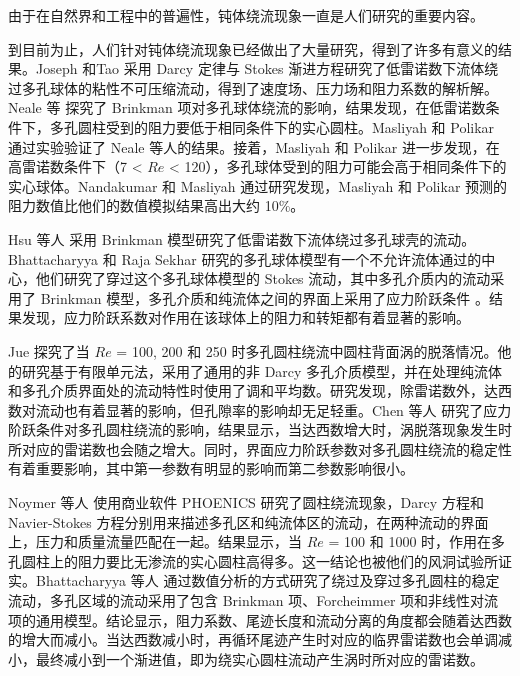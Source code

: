 由于在自然界和工程中的普遍性，钝体绕流现象一直是人们研究的重要内容。

到目前为止，人们针对钝体绕流现象已经做出了大量研究，得到了许多有意义的结果。Joseph 和Tao \cite{joseph1964effect} 采用 Darcy 定律与 Stokes 渐进方程研究了低雷诺数下流体绕过多孔球体的粘性不可压缩流动，得到了速度场、压力场和阻力系数的解析解。Neale 等 \cite{neale1973creeping} 探究了 Brinkman 项对多孔球体绕流的影响，结果发现，在低雷诺数条件下，多孔圆柱受到的阻力要低于相同条件下的实心圆柱。Masliyah 和 Polikar \cite{masliyah1980terminal} 通过实验验证了 Neale 等人的结果。接着，Masliyah 和 Polikar \cite{masliyah1980terminal} 进一步发现，在高雷诺数条件下（7 < $Re$ < 120），多孔球体受到的阻力可能会高于相同条件下的实心球体。Nandakumar 和 Masliyah \cite{nandakumar1982laminar} 通过研究发现，Masliyah 和 Polikar 预测的阻力数值比他们的数值模拟结果高出大约 10\%。

Hsu 等人 \cite{hsu2004re} 采用 Brinkman 模型研究了低雷诺数下流体绕过多孔球壳的流动。Bhattacharyya 和 Raja Sekhar \cite{bhattacharyya2004viscous} 研究的多孔球体模型有一个不允许流体通过的中心，他们研究了穿过这个多孔球体模型的 Stokes 流动，其中多孔介质内的流动采用了 Brinkman 模型，多孔介质和纯流体之间的界面上采用了应力阶跃条件 \cite{ochoa1995momentum1,ochoa1995momentum2}。结果发现，应力阶跃系数对作用在该球体上的阻力和转矩都有着显著的影响。

Jue \cite{jue2004numerical} 探究了当 $Re$ = 100, 200 和 250 时多孔圆柱绕流中圆柱背面涡的脱落情况。他的研究基于有限单元法，采用了通用的非 Darcy 多孔介质模型，并在处理纯流体和多孔介质界面处的流动特性时使用了调和平均数。研究发现，除雷诺数外，达西数对流动也有着显著的影响，但孔隙率的影响却无足轻重。Chen 等人 \cite{chen2008numerical} 研究了应力阶跃条件对多孔圆柱绕流的影响，结果显示，当达西数增大时，涡脱落现象发生时所对应的雷诺数也会随之增大。同时，界面应力阶跃参数对多孔圆柱绕流的稳定性有着重要影响，其中第一参数有明显的影响而第二参数影响很小。

Noymer 等人 \cite{noymer1998drag} 使用商业软件 PHOENICS 研究了圆柱绕流现象，Darcy 方程和 Navier-Stokes 方程分别用来描述多孔区和纯流体区的流动，在两种流动的界面上，压力和质量流量匹配在一起。结果显示，当 $Re$ = 100 和 1000 时，作用在多孔圆柱上的阻力要比无渗流的实心圆柱高得多。这一结论也被他们的风洞试验所证实。Bhattacharyya 等人 \cite{bhattacharyya2006fluid} 通过数值分析的方式研究了绕过及穿过多孔圆柱的稳定流动，多孔区域的流动采用了包含 Brinkman 项、Forcheimmer 项和非线性对流项的通用模型。结论显示，阻力系数、尾迹长度和流动分离的角度都会随着达西数的增大而减小。当达西数减小时，再循环尾迹产生时对应的临界雷诺数也会单调减小，最终减小到一个渐进值，即为绕实心圆柱流动产生涡时所对应的雷诺数。

